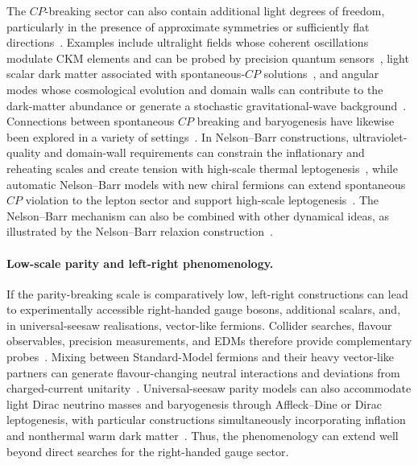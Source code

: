 \documentclass[review]{elsarticle}
\numberwithin{equation}{section}
\numberwithin{table}{section}
\numberwithin{figure}{section}
\begin{document}
The $CP$-breaking sector can also contain additional light degrees of freedom, particularly in the presence of approximate symmetries or sufficiently flat directions~\cite{Liu:2025ycm}. Examples include ultralight fields whose coherent oscillations modulate CKM elements and can be probed by precision quantum sensors~\cite{Dine:2024bxv}, light scalar dark matter associated with spontaneous-$CP$ solutions~\cite{Feruglio:2024dnc}, and angular modes whose cosmological evolution and domain walls can contribute to the dark-matter abundance or generate a stochastic gravitational-wave background~\cite{Murai:2024bjy}. Connections between spontaneous $CP$ breaking and baryogenesis have likewise been explored in a variety of settings~\cite{Evans:2020vil,Fujikura:2022sot,Suematsu:2023jqa,Jiang:2024frx,Duch:2025abl}. In Nelson--Barr constructions, ultraviolet-quality and domain-wall requirements can constrain the inflationary and reheating scales and create tension with high-scale thermal leptogenesis~\cite{Asadi:2022vys,Murai:2024alz}, while automatic Nelson--Barr models with new chiral fermions can extend spontaneous $CP$ violation to the lepton sector and support high-scale leptogenesis~\cite{Murgui:2025scx}. The Nelson--Barr mechanism can also be combined with other dynamical ideas, as illustrated by the Nelson--Barr relaxion construction~\cite{Davidi:2017gir}.

\paragraph{Low-scale parity and left-right phenomenology.}

If the parity-breaking scale is comparatively low, left-right constructions can lead to experimentally accessible right-handed gauge bosons, additional scalars, and, in universal-seesaw realisations, vector-like fermions. Collider searches, flavour observables, precision measurements, and EDMs therefore provide complementary probes~\cite{Mohapatra:1978fy,Craig:2020bnv}. Mixing between Standard-Model fermions and their heavy vector-like partners can generate flavour-changing neutral interactions and deviations from charged-current unitarity~\cite{Dcruz:2023mvf}. Universal-seesaw parity models can also accommodate light Dirac neutrino masses and baryogenesis through Affleck--Dine or Dirac leptogenesis, with particular constructions simultaneously incorporating inflation and nonthermal warm dark matter~\cite{Babu:2023srr,Babu:2024glr}. Thus, the phenomenology can extend well beyond direct searches for the right-handed gauge sector.
\end{document}
